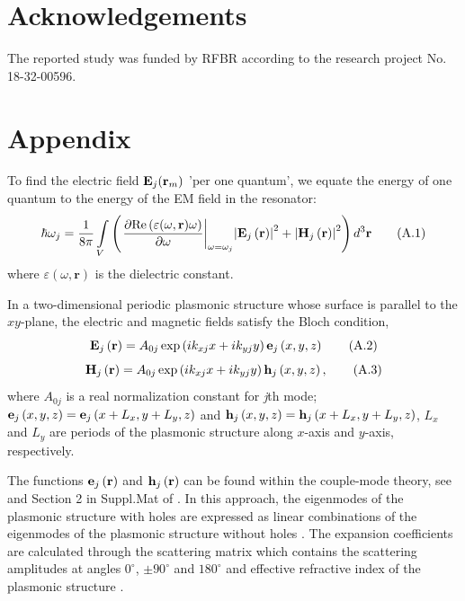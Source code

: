 \documentclass[aps,pra,amsmath,amssymb,onecolumn,superscriptaddress,showpacs,floatfix,]{revtex4-1}
\begin{document}
\section*{Acknowledgements}

The reported study was funded by RFBR according to the research project No. 18-32-00596.

\section*{Appendix}
To find the electric field ${{\bf{E}}_j}({{\bf{r}}_m})$  'per one quantum', we equate the energy of one quantum to the energy of the EM field in the resonator:
\begin{equation}
\hbar {\omega _j} = \frac{1}{{8\pi }}\int\limits_V {\left( {{{\left. {\frac{{\partial {\mathop{\rm Re}\nolimits} \left( {\varepsilon(\omega, \textbf{r}) \omega } \right)}}{{\partial \omega }}} \right|}_{\omega  = {\omega _j}}}{{\left| {{{\bf{E}}_j}\left( {\bf{r}} \right)} \right|}^2} + {{\left| {{{\bf{H}}_j}\left( {\bf{r}} \right)} \right|}^2}} \right){d^3}{\bf{r}}} \tag{A.1}
\end{equation}
where $\varepsilon (\omega, \textbf{r})$  is the dielectric constant.

In a two-dimensional periodic plasmonic structure whose surface is parallel to the $xy$-plane, the electric and magnetic fields satisfy the Bloch condition,
\begin{equation}
{{\bf{E}}_j}\left( {\bf{r}} \right) = {A_{0j}}\exp \left( {i{k_{xj}}x + i{k_{yj}}y} \right){{\bf{e}}_j}\left( {x,y,z} \right) \tag{A.2}
\end{equation}
\begin{equation}
{{\bf{H}}_j}\left( {\bf{r}} \right) = {A_{0j}}\exp \left( {i{k_{xj}}x + i{k_{yj}}y} \right){{\bf{h}}_j}\left( {x,y,z} \right), \tag{A.3}
\end{equation}
where $A_{0j}$ is a real normalization constant for \textit{j}th mode; ${{\bf{e}}_j}\left( {x,y,z} \right) = {{\bf{e}}_j}\left( {x + {L_x},y + {L_y},z} \right)$  and ${{\bf{h}}_j}\left( {x,y,z} \right) = {{\bf{h}}_j}\left( {x + {L_x},y + {L_y},z} \right)$, $L_x$ and $L_y$ are periods of the plasmonic structure along $x$-axis and $y$-axis, respectively.

The functions ${{\bf{e}}_j}\left(\textbf{r}\right)$ and ${{\bf{h}}_j}\left(\textbf{r}\right)$ can be found within the couple-mode theory, see \cite{TennerJOpt,TennerACSPhot} and Section 2 in Suppl.Mat of \cite{nefedkin2018acsphot}. In this approach, the eigenmodes of the plasmonic structure with holes are expressed as linear combinations of the eigenmodes of the plasmonic structure without holes \cite{TennerJOpt,TennerACSPhot}. The expansion coefficients are calculated through the scattering matrix which contains the scattering amplitudes at angles $0^{\circ }$, $\pm 90^{\circ }$ and $180^{\circ }$ and effective refractive index of the plasmonic structure \cite{TennerJOpt,TennerACSPhot}.
\end{document}
